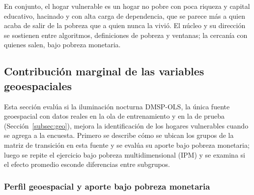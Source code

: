 \documentclass[12pt, letterpaper]{article}
\begin{document}


En conjunto, el hogar vulnerable es un hogar no pobre con poca riqueza y
capital educativo, hacinado y con alta carga de dependencia, que se
parece más a quien acaba de salir de la pobreza que a quien nunca la
vivió. El núcleo y su dirección se sostienen entre algoritmos,
definiciones de pobreza y ventanas; la cercanía con quienes salen, bajo
pobreza monetaria.

\subsection{Contribución marginal de las variables geoespaciales}
\label{subsec:marginal_geo}

Esta sección evalúa si la iluminación nocturna DMSP-OLS, la única fuente
geoespacial con datos reales en la ola de entrenamiento y en la de prueba
(Sección~\ref{subsec:geo}), mejora la identificación de los hogares
vulnerables cuando se agrega a la encuesta. Primero se describe cómo se
ubican los grupos de la matriz de transición en esta fuente y se evalúa su
aporte bajo pobreza monetaria; luego se repite el ejercicio bajo pobreza
multidimensional (IPM) y se examina si el efecto promedio esconde
diferencias entre subgrupos.

\subsubsection{Perfil geoespacial y aporte bajo pobreza monetaria}
\label{subsec:perfil_geo}
\label{subsec:marginal}
\end{document}

